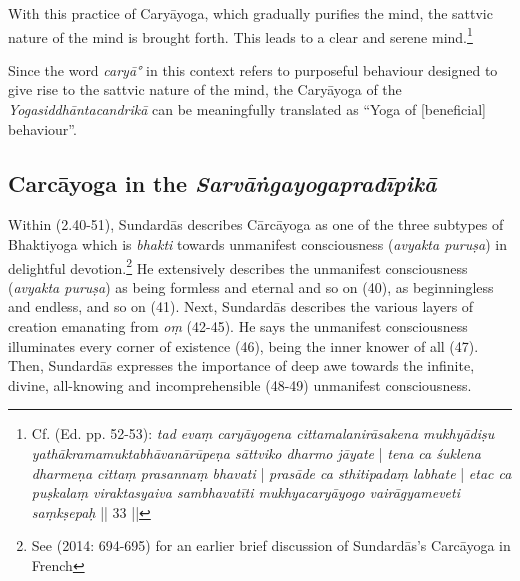  With this practice of Caryāyoga, which gradually purifies the mind, the sattvic nature of the mind is brought forth. This leads to a clear and serene mind.\footnote{Cf.  (Ed. pp. 52-53): \textit{tad evaṃ caryāyogena cittamalanirāsakena mukhyādiṣu yathākramamuktabhāvanārūpeṇa sāttviko dharmo jāyate} | \textit{tena ca śuklena dharmeṇa cittaṃ prasannaṃ bhavati} | \textit{prasāde ca sthitipadaṃ labhate} | \textit{etac ca puṣkalaṃ viraktasyaiva sambhavatīti mukhyacaryāyogo vairāgyameveti saṃkṣepaḥ} || 33 ||}

 Since the word \textit{caryā°} in this context refers to purposeful behaviour designed to give rise to the sattvic nature of the mind, the Caryāyoga of the \textit{Yogasiddhāntacandrikā} can be meaningfully translated as ``Yoga of [beneficial] behaviour''.  

\subsection{Carcāyoga in the \textit{Sarvāṅgayogapradīpikā}}
\label{carcasarvanga}
Within  (2.40-51), Sundardās describes Cārcāyoga as one of the three subtypes of Bhaktiyoga which is \textit{bhakti} towards unmanifest consciousness (\textit{avyakta puruṣa}) in delightful devotion.\footnote{See \citeauthor{burger2014sarvangayogapradipika} (2014: 694-695) for an earlier brief discussion of Sundardās's Carcāyoga in French} He extensively describes the unmanifest consciousness (\textit{avyakta puruṣa}) as being formless and eternal and so on (40), as beginningless and endless, and so on (41). Next, Sundardās describes the various layers of creation emanating from \textit{oṃ} (42-45). He says the unmanifest consciousness illuminates every corner of existence (46), being the inner knower of all (47). Then, Sundardās expresses the importance of deep awe towards the infinite, divine, all-knowing and incomprehensible (48-49) unmanifest consciousness.

